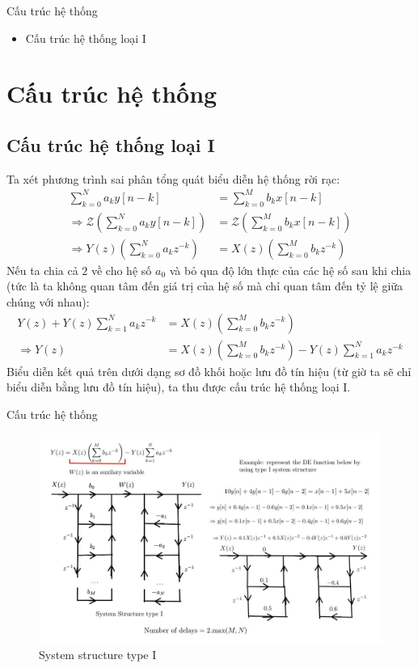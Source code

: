 \documentclass[8pt]{beamer}
\begin{document}
\begin{frame}{Cấu trúc hệ thống}
\begin{itemize}
	\item Cấu trúc hệ thống loại I
\end{itemize}
\section{Cấu trúc hệ thống}
\subsection{Cấu trúc hệ thống loại I}
Ta xét phương trình sai phân tổng quát biểu diễn hệ thống rời rạc:
\begin{equation*}
	\begin{split}
		\sum_{k=0}^{N}a_{k}y[n-k]&=\sum_{k=0}^{M}b_{k}x[n-k]\\
		\Rightarrow \mathscr{Z}\left(\sum_{k=0}^{N}a_{k}y[n-k]\right)&=\mathscr{Z}\left(\sum_{k=0}^{M}b_{k}x[n-k]\right)\\
		\Rightarrow Y(z)\left(\sum_{k=0}^{N}a_{k}z^{-k}\right)&=X(z)\left(\sum_{k=0}^{M}b_{k}z^{-k}\right)
	\end{split}
\end{equation*}
Nếu ta chia cả $2$ về cho hệ số $a_{0}$ và bỏ qua độ lớn thực của các hệ số sau khi chia (tức là ta không quan tâm đến giá trị của hệ số mà chỉ quan tâm đến tỷ lệ giữa chúng với nhau):
\begin{equation*}
\begin{split}
	Y(z)+Y(z)\sum_{k=1}^{N}a_{k}z^{-k}&=X(z)\left(\sum_{k=0}^{M}b_{k}z^{-k}\right)\\
	\Rightarrow Y(z)&=X(z)\left(\sum_{k=0}^{M}b_{k}z^{-k}\right)-Y(z)\sum_{k=1}^{N}a_{k}z^{-k}
\end{split}
\end{equation*}
Biểu diễn kết quả trên dưới dạng sơ đồ khối hoặc lưu đồ tín hiệu (từ giờ ta sẽ chỉ biểu diễn bằng lưu đồ tín hiệu), ta thu được cấu trúc hệ thống loại I.
\end{frame}
\begin{frame}{Cấu trúc hệ thống}
\begin{figure}[h]
			\includegraphics[width=1.1\textwidth]{4.jpg}
			\caption{System structure type I}			\label{fig:re4}

		\end{figure}

\end{frame}
\end{document}
